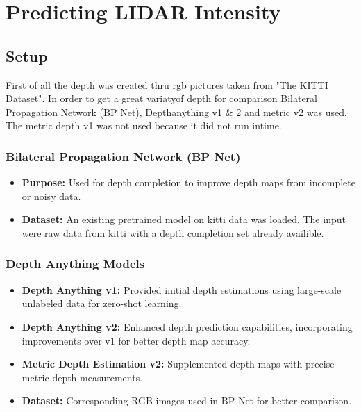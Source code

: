 \chapter{Predicting LIDAR Intensity} %
\section{Setup}
First of all the depth was created thru rgb pictures taken from "The KITTI Dataset". In order to get a great variatyof depth for comparison Bilateral Propagation Network (BP Net), Depthanything v1 \& 2 and metric v2 was used. The metric depth v1 was not used because it did not run intime.
\subsection{Bilateral Propagation Network (BP Net)}
\begin{itemize}
	\item \textbf{Purpose:} Used for depth completion to improve depth maps from incomplete or noisy data.
	\item \textbf{Dataset:} An existing pretrained model on kitti data was loaded. The input were raw data from kitti with a depth completion set already availible. 
\end{itemize}

\subsection{Depth Anything Models}
\begin{itemize}
	\item \textbf{Depth Anything v1:} Provided initial depth estimations using large-scale unlabeled data for zero-shot learning.
	\item \textbf{Depth Anything v2:} Enhanced depth prediction capabilities, incorporating improvements over v1 for better depth map accuracy.


 	\item \textbf {Metric Depth Estimation v2:} Supplemented depth maps with precise metric depth measurements.

	\item \textbf{Dataset:} Corresponding RGB images used in BP Net for better comparison.
\end{itemize}

